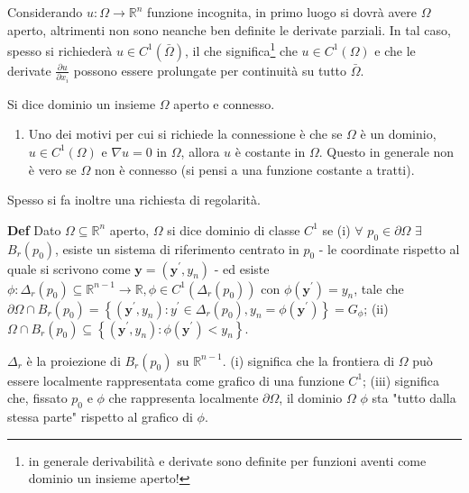 \documentclass{article}
\begin{document}
Considerando $u:\Omega \rightarrow 
\mathbb{R}
^{n}$ funzione incognita, in primo luogo si dovr\`{a} avere $\Omega $
aperto, altrimenti non sono neanche ben definite le derivate parziali. In
tal caso, spesso si richieder\`{a} $u\in C^{1}\left( \bar{\Omega}\right) $,
il che significa\footnote{%
in generale derivabilit\`{a} e derivate sono definite per funzioni aventi
come dominio un insieme aperto!} che $u\in C^{1}\left( \Omega \right) $ e
che le derivate $\frac{\partial u}{\partial x_{i}}$ possono essere
prolungate per continuit\`{a} su tutto $\bar{\Omega}$.

Si dice dominio un insieme $\Omega $ aperto e connesso.

\begin{enumerate}
\item Uno dei motivi per cui si richiede la connessione \`{e} che se $\Omega 
$ \`{e} un dominio, $u\in C^{1}\left( \Omega \right) $ e $\nabla u=0$ in $%
\Omega $, allora $u$ \`{e} costante in $\Omega $. Questo in generale non 
\`{e} vero se $\Omega $ non \`{e} connesso (si pensi a una funzione costante
a tratti).
\end{enumerate}

Spesso si fa inoltre una richiesta di regolarit\`{a}.

\textbf{Def} Dato $\Omega \subseteq 
\mathbb{R}
^{n}$ aperto, $\Omega $ si dice dominio di classe $C^{1}$ se (i) $\forall $ $%
p_{0}\in \partial \Omega $ $\exists $ $B_{r}\left( p_{0}\right) $, esiste un
sistema di riferimento centrato in $p_{0}$ - le coordinate rispetto al quale
si scrivono come $\mathbf{y}=\left( \mathbf{y}^{\prime },y_{n}\right) $ - ed
esiste $\phi :\Delta _{r}\left( p_{0}\right) \subseteq 
\mathbb{R}
^{n-1}\rightarrow 
\mathbb{R}
,\phi \in C^{1}\left( \Delta _{r}\left( p_{0}\right) \right) $ con $\phi
\left( \mathbf{y}^{\prime }\right) =y_{n}$, tale che $\partial \Omega \cap
B_{r}\left( p_{0}\right) =\left\{ \left( \mathbf{y}^{\prime },y_{n}\right)
:y^{\prime }\in \Delta _{r}\left( p_{0}\right) ,y_{n}=\phi \left( \mathbf{y}%
^{\prime }\right) \right\} =G_{\phi }$; (ii) $\Omega \cap B_{r}\left(
p_{0}\right) \subseteq \left\{ \left( \mathbf{y}^{\prime },y_{n}\right)
:\phi \left( \mathbf{y}^{\prime }\right) <y_{n}\right\} $.

$\Delta _{r}$ \`{e} la proiezione di $B_{r}\left( p_{0}\right) $ su $%
\mathbb{R}
^{n-1}$. (i) significa che la frontiera di $\Omega $ pu\`{o} essere
localmente rappresentata come grafico di una funzione $C^{1}$; (iii)
significa che, fissato $p_{0}$ e $\phi $ che rappresenta localmente $%
\partial \Omega $, il dominio $\Omega $ $\phi $ sta "tutto dalla stessa
parte" rispetto al grafico di $\phi $.
\end{document}
